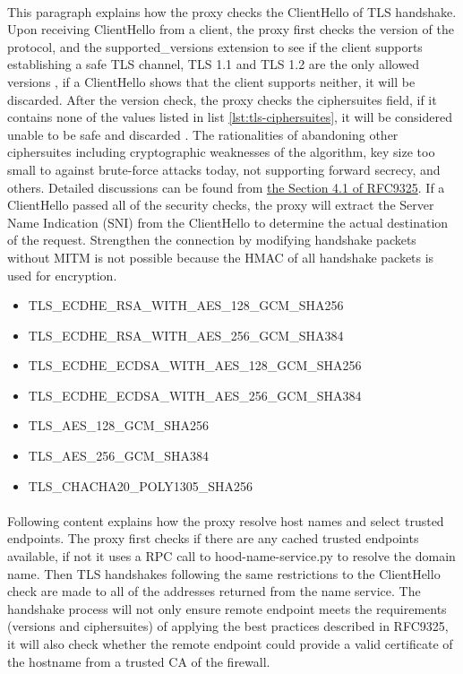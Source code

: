\documentclass[mscthesis]{usiinfthesis}
\begin{document}
\paragraph{}
This paragraph explains how the proxy checks the ClientHello of TLS handshake. Upon receiving ClientHello from a client, the proxy first checks the version of the protocol, and the supported\_versions extension to see if the client supports establishing a safe TLS channel, TLS 1.1 and TLS 1.2 are the only allowed versions \citep{rfc:bstprc}, if a ClientHello shows that the client supports neither, it will be discarded. After the version check, the proxy checks the ciphersuites field, if it contains none of the values listed in list \ref{lst:tls-ciphersuites}, it will be considered unable to be safe and discarded \citep{rfc:bstprc}. The rationalities of abandoning other ciphersuites including cryptographic weaknesses of the algorithm, key size too small to against brute-force attacks today, not supporting forward secrecy, and others. Detailed discussions can be found from \href{https://www.rfc-editor.org/rfc/rfc9325.html#name-general-guidelines}{the Section 4.1 of RFC9325}. If a ClientHello passed all of the security checks, the proxy will extract the Server Name Indication (SNI) from the ClientHello to determine the actual destination of the request. Strengthen the connection by modifying handshake packets without MITM is not possible because the HMAC of all handshake packets is used for encryption.

\begin{itemlist}[H]
  \begin{itemize}
    \item TLS\_ECDHE\_RSA\_WITH\_AES\_128\_GCM\_SHA256
    \item TLS\_ECDHE\_RSA\_WITH\_AES\_256\_GCM\_SHA384
    \item TLS\_ECDHE\_ECDSA\_WITH\_AES\_128\_GCM\_SHA256
    \item TLS\_ECDHE\_ECDSA\_WITH\_AES\_256\_GCM\_SHA384
    \item TLS\_AES\_128\_GCM\_SHA256
    \item TLS\_AES\_256\_GCM\_SHA384
    \item TLS\_CHACHA20\_POLY1305\_SHA256
  \end{itemize}
  \label{lst:tls-ciphersuites}
\end{itemlist}

\paragraph{}
Following content explains how the proxy resolve host names and select trusted endpoints. The proxy first checks if there are any cached trusted endpoints available, if not it uses a RPC call to hood-name-service.py to resolve the domain name. Then TLS handshakes following the same restrictions to the ClientHello check are made to all of the addresses returned from the name service. The handshake process will not only ensure remote endpoint meets the requirements (versions and ciphersuites) of applying the best practices described in RFC9325, it will also check whether the remote endpoint could provide a valid certificate of the hostname from a trusted CA of the firewall.
\end{document}
